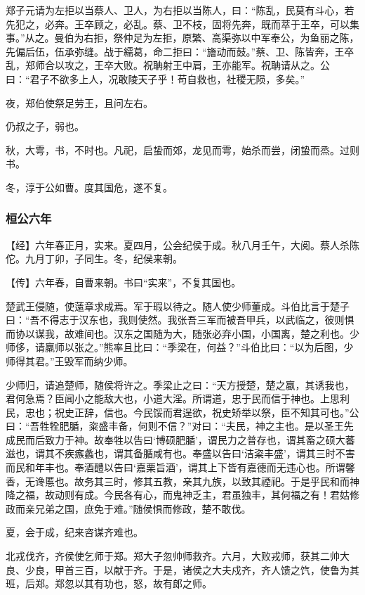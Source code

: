 \documentclass[]{article}
\begin{document}
郑子元请为左拒以当蔡人、卫人，为右拒以当陈人，曰：``陈乱，民莫有斗心，若先犯之，必奔。王卒顾之，必乱。蔡、卫不枝，固将先奔，既而萃于王卒，可以集事。''从之。曼伯为右拒，祭仲足为左拒，原繁、高渠弥以中军奉公，为鱼丽之陈，先偏后伍，伍承弥缝。战于繻葛，命二拒曰：``旝动而鼓。''蔡、卫、陈皆奔，王卒乱，郑师合以攻之，王卒大败。祝聃射王中肩，王亦能军。祝聃请从之。公曰：``君子不欲多上人，况敢陵天子乎！苟自救也，社稷无陨，多矣。''

夜，郑伯使祭足劳王，且问左右。

仍叔之子，弱也。

秋，大雩，书，不时也。凡祀，启蛰而郊，龙见而雩，始杀而尝，闭蛰而烝。过则书。

冬，淳于公如曹。度其国危，遂不复。

\hypertarget{header-n220}{%
\subsubsection{桓公六年}\label{header-n220}}

【经】六年春正月，实来。夏四月，公会纪侯于成。秋八月壬午，大阅。蔡人杀陈佗。九月丁卯，子同生。冬，纪侯来朝。

【传】六年春，自曹来朝。书曰``实来''，不复其国也。

楚武王侵随，使薳章求成焉。军于瑕以待之。随人使少师董成。斗伯比言于楚子曰：``吾不得志于汉东也，我则使然。我张吾三军而被吾甲兵，以武临之，彼则惧而协以谋我，故难间也。汉东之国随为大，随张必弃小国，小国离，楚之利也。少师侈，请羸师以张之。''熊率且比曰：``季梁在，何益？''斗伯比曰：``以为后图，少师得其君。''王毁军而纳少师。

少师归，请追楚师，随侯将许之。季梁止之曰：``天方授楚，楚之蠃，其诱我也，君何急焉？臣闻小之能敌大也，小道大淫。所谓道，忠于民而信于神也。上思利民，忠也；祝史正辞，信也。今民馁而君逞欲，祝史矫举以祭，臣不知其可也。''公曰：``吾牲牷肥腯，粢盛丰备，何则不信？''对曰：``夫民，神之主也。是以圣王先成民而后致力于神。故奉牲以告曰`博硕肥腯'，谓民力之普存也，谓其畜之硕大蕃滋也，谓其不疾瘯蠡也，谓其备腯咸有也。奉盛以告曰`洁粢丰盛'，谓其三时不害而民和年丰也。奉酒醴以告曰`嘉栗旨酒'，谓其上下皆有嘉德而无违心也。所谓馨香，无谗慝也。故务其三时，修其五教，亲其九族，以致其禋祀。于是乎民和而神降之福，故动则有成。今民各有心，而鬼神乏主，君虽独丰，其何福之有！君姑修政而亲兄弟之国，庶免于难。''随侯惧而修政，楚不敢伐。

夏，会于成，纪来咨谋齐难也。

北戎伐齐，齐侯使乞师于郑。郑大子忽帅师救齐。六月，大败戎师，获其二帅大良、少良，甲首三百，以献于齐。于是，诸侯之大夫戍齐，齐人馈之饩，使鲁为其班，后郑。郑忽以其有功也，怒，故有郎之师。
\end{document}

